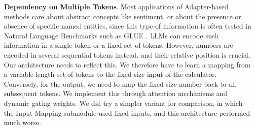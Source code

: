 \documentclass[11pt]{article}
\begin{document}
\textbf{Dependency on Multiple Tokens}.
Most applications of Adapter-based methods care about abstract concepts like sentiment, or about the presence or absence of specific named entities, since this type of information is often tested in Natural Language Benchmarks such as GLUE \citep{wang2019gluemultitaskbenchmarkanalysis,houlsby2019parameter}.
LLMs can encode such information in a single token or a fixed set of tokens.
However, numbers are encoded in several sequential tokens instead, and their relative position is crucial.
Our architecture needs to reflect this.
We therefore have to learn a mapping from a variable-length set of tokens to the fixed-size input of the calculator.
Conversely, for the output, we need to map the fixed-size number back to all subsequent tokens.
We implement this through attention mechanisms and dynamic gating weights.
We did try a simpler variant for comparison, in which the Input Mapping submodule used fixed inputs, and this architecture performed much worse.
\end{document}
